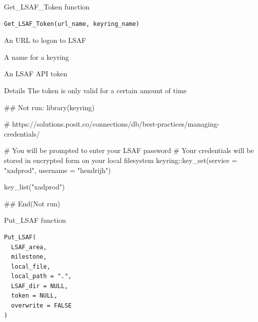 \documentclass[a4paper]{book}
\begin{document}
%
\begin{Description}
Get\_LSAF\_Token function
\end{Description}
%
\begin{Usage}
\begin{verbatim}
Get_LSAF_Token(url_name, keyring_name)
\end{verbatim}
\end{Usage}
%
\begin{Arguments}
\begin{ldescription}
\item[\code{url\_name}] An URL to logon to LSAF

\item[\code{keyring\_name}] A name for a keyring
\end{ldescription}
\end{Arguments}
%
\begin{Value}
An LSAF API token
\end{Value}
%
\begin{Section}{Details}
The token is only valid for a certain amount of time
\end{Section}
%
\begin{Examples}
\begin{ExampleCode}
## Not run: 
 library(keyring)

 # https://solutions.posit.co/connections/db/best-practices/managing-credentials/

 # You will be prompted to enter your LSAF password
 # Your credentials will be stored in encrypted form on your local filesystem
 keyring::key_set(service = "xadprod",
                  username = "hendrijh")

 key_list("xadprod")
 
## End(Not run)

\end{ExampleCode}
\end{Examples}
%
\begin{Description}
Put\_LSAF function
\end{Description}
%
\begin{Usage}
\begin{verbatim}
Put_LSAF(
  LSAF_area,
  milestone,
  local_file,
  local_path = ".",
  LSAF_dir = NULL,
  token = NULL,
  overwrite = FALSE
)
\end{verbatim}
\end{Usage}
%
\end{document}
